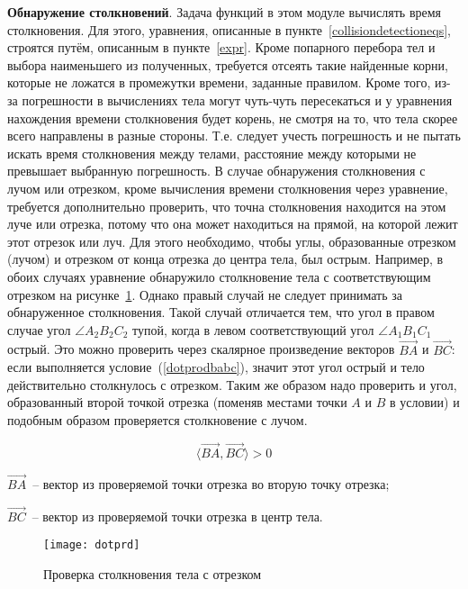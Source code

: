 \textbf{Обнаружение столкновений}.\label{collisiondetectiondescr}
Задача функций в этом модуле вычислять время столкновения.
Для этого, уравнения, описанные в пункте~\ref{collisiondetectioneqs}, строятся путём, описанным в пункте~\ref{expr}.
Кроме попарного перебора тел и выбора наименьшего из полученных, требуется отсеять такие найденные корни, которые
не ложатся в промежутки времени, заданные правилом. Кроме того, из-за погрешности в вычислениях тела могут чуть-чуть пересекаться и
у уравнения нахождения времени столкновения будет корень, не смотря на то, что тела скорее всего направлены в разные стороны.
Т.е. следует учесть погрешность и не пытать искать время столкновения между телами, расстояние между которыми не превышает
выбранную погрешность. В случае обнаружения столкновения с лучом или отрезком, кроме вычисления времени столкновения через уравнение,
требуется дополнительно проверить, что точна столкновения находится на этом луче или отрезка, потому что она может находиться на прямой,
на которой лежит этот отрезок или луч. Для этого необходимо, чтобы углы, образованные отрезком (лучом) и отрезком от конца отрезка
до центра тела, был острым. Например, в обоих случаях уравнение обнаружило столкновение тела с соответствующим отрезком на рисунке~\ref{dotprdfig}.
Однако правый случай не следует принимать за обнаруженное столкновения. Такой случай отличается тем, что угол в правом случае
угол \(\angle A_2 B_2 C_2\) тупой, когда в левом соответствующий угол \(\angle A_1 B_1 C_1\) острый.
Это можно проверить через скалярное произведение векторов \(\vec{BA}\) и \(\vec{BC}\): если выполняется условие~(\ref{dotprodbabc}), значит этот угол острый
и тело действительно столкнулось с отрезком. Таким же образом надо проверить и угол, образованный второй точкой отрезка
(поменяв местами точки \(A\) и \(B\) в условии) и подобным образом проверяется столкновение с лучом.

\begin{equation}\label{dotprodbabc}
    \langle \vec{BA}, \vec{BC} \rangle > 0
\end{equation}

\begin{Underequation}
    \(\vec{BA}\)~-- вектор из проверяемой точки отрезка во вторую точку отрезка;

    \(\vec{BC}\)~-- вектор из проверяемой точки отрезка в центр тела.
\end{Underequation}

\begin{figure}[H]
    \centering
    \texttt{[image: dotprd]}
    \caption{Проверка столкновения тела с отрезком\label{dotprdfig}}
\end{figure}

